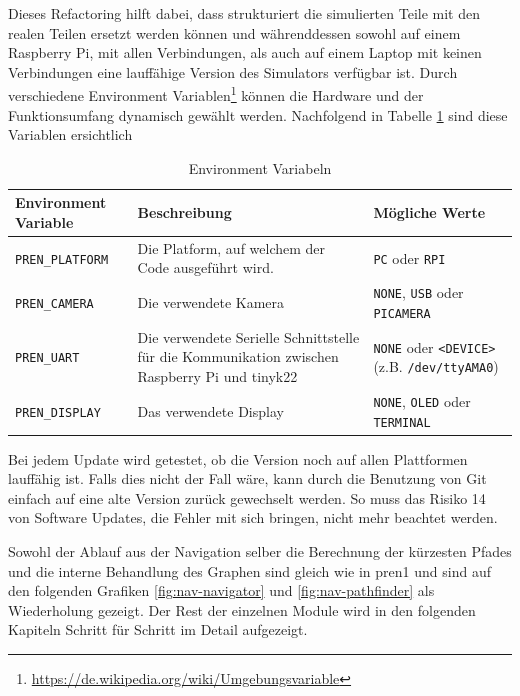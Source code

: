 Dieses Refactoring hilft dabei, dass strukturiert die simulierten Teile mit den realen Teilen ersetzt werden können und währenddessen sowohl auf einem Raspberry Pi, mit allen Verbindungen, als auch auf einem Laptop mit keinen Verbindungen eine lauffähige Version des Simulators verfügbar ist.
Durch verschiedene Environment Variablen\footnote{\url{https://de.wikipedia.org/wiki/Umgebungsvariable}} können die Hardware und der Funktionsumfang dynamisch gewählt werden. Nachfolgend in Tabelle \ref{table:environment-variables} sind diese Variablen ersichtlich


\begin{table}[H]
    \centering
    \begin{tabularx}{\textwidth}{|X|X|X|}
    \hline
        \textbf{Environment Variable} & \textbf{Beschreibung} & \textbf{Mögliche Werte}\\
        \hline
         \verb|PREN_PLATFORM| & Die Platform, auf welchem der Code ausgeführt wird. & \verb|PC| oder \verb|RPI| \\
         \hline
         \verb|PREN_CAMERA| & Die verwendete Kamera & \verb|NONE|, \verb|USB| oder \verb|PICAMERA| \\
         \hline
         \verb|PREN_UART| & Die verwendete Serielle Schnittstelle für die Kommunikation zwischen Raspberry Pi und \gls{tinyk22} & \verb|NONE| oder \verb|<DEVICE>| \newline (z.B. \verb|/dev/ttyAMA0|) \\
         \hline
         \verb|PREN_DISPLAY| & Das verwendete Display &  \verb|NONE|, \verb|OLED| oder \verb|TERMINAL|  \\
         \hline
    \end{tabularx}
    \caption{Environment Variabeln}
    \label{table:environment-variables}
\end{table}

Bei jedem Update wird getestet, ob die Version noch auf allen Plattformen lauffähig ist. Falls dies nicht der Fall wäre, kann durch die Benutzung von Git einfach auf eine alte Version zurück gewechselt werden. So muss das Risiko 14 von Software Updates, die Fehler mit sich bringen, nicht mehr beachtet werden.

Sowohl der Ablauf aus der Navigation selber die Berechnung der kürzesten Pfades und die interne Behandlung des Graphen sind gleich wie in \acrshort{pren1} und sind auf den folgenden Grafiken \ref{fig:nav-navigator} und \ref{fig:nav-pathfinder} als Wiederholung gezeigt. Der Rest der einzelnen Module wird in den folgenden Kapiteln Schritt für Schritt im Detail aufgezeigt.

